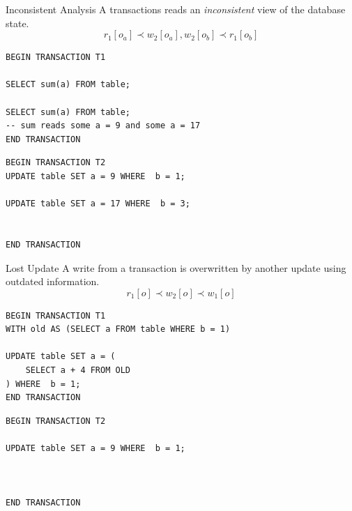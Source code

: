 \begin{definitionbox}{Inconsistent Analysis}
    A transactions reads an \textit{inconsistent} view of the database state.
    \[r_1[o_a] \prec w_2[o_a] ,  w_2[o_b] \prec r_1[o_b]\]
    \unfinished
    \tcblower
    \begin{minipage}[t]{.49\textwidth}
    \begin{verbatim}
BEGIN TRANSACTION T1

SELECT sum(a) FROM table;

SELECT sum(a) FROM table;
-- sum reads some a = 9 and some a = 17
END TRANSACTION
       \end{verbatim}
   \end{minipage} \hfill \begin{minipage}[t]{.49\textwidth}
       \begin{verbatim}
BEGIN TRANSACTION T2
UPDATE table SET a = 9 WHERE  b = 1;

UPDATE table SET a = 17 WHERE  b = 3;


END TRANSACTION
       \end{verbatim}
   \end{minipage}
\end{definitionbox}

\begin{definitionbox}{Lost Update}
    A write from a transaction is overwritten by another update using outdated information.
    \[r_1[o] \prec w_2[o] \prec w_1[o]\]
    \tcblower
    \begin{minipage}[t]{.49\textwidth}
        \begin{verbatim}
BEGIN TRANSACTION T1
WITH old AS (SELECT a FROM table WHERE b = 1)

UPDATE table SET a = (
    SELECT a + 4 FROM OLD
) WHERE  b = 1;
END TRANSACTION
        \end{verbatim}
    \end{minipage} \hfill \begin{minipage}[t]{.49\textwidth}
        \begin{verbatim}
BEGIN TRANSACTION T2

UPDATE table SET a = 9 WHERE  b = 1;



END TRANSACTION
        \end{verbatim}
    \end{minipage}
\end{definitionbox}

\newcommand{\prevented}{\textcolor{red}{Prevented}}
\newcommand{\allowed}{\textcolor{ForestGreen}{Allowed}}
